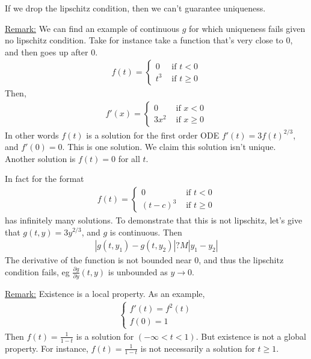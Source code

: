 \documentclass{article}
\newcommand*{\txt}[1]{\text{ #1 }}%
\begin{document}
If we drop the lipschitz condition, then we can't guarantee uniqueness.

\underline{Remark:} We can find an example of continuous $g$ for which uniqueness fails given no lipschitz condition. Take for instance take a function that's very close to 0, and then goes up after 0. \begin{align*}
    f(t)=\begin{cases}
        0 & \txt{if}t<0\\
        t^3 & \txt{if}t\geq 0
    \end{cases}
\end{align*}
Then, \begin{align*}
    f'(x)=\begin{cases}
        0 & \txt{if}x<0\\
        3x^2 & \txt{if}x\geq 0
    \end{cases}
\end{align*}
In other words $f(t)$ is a solution for the first order ODE $f'(t)=3f(t)^{2/3}$, and $f'(0)=0$. This is one solution. We claim this solution isn't unique. Another solution is $f(t)=0$ for all $t$.

In fact for the format \begin{align*}
    f(t)=\begin{cases}
        0 & \txt{if}t<0\\
        (t-c)^3 & \txt{if}t\geq 0
    \end{cases}
\end{align*} has infinitely many solutions. To demonstrate that this is not lipschitz, let's give that $g(t,y)=3y^{2/3}$, and $g$ is continuous. Then \begin{align*}
    |g(t,y_1)-g(t,y_2)|?M|y_1-y_2|
\end{align*} The derivative of the function is not bounded near 0, and thus the lipschitz condition fails, eg $\frac{\partial g}{\partial y}(t,y)$ is unbounded as $y\to 0$.

\underline{Remark:} Existence is a local property. As an example, \begin{align*}
    \begin{cases}
        f'(t)=f^2(t) \\
        f(0)=1
    \end{cases}
\end{align*} Then $f(t)=\frac{1}{1-t}$ is a solution for $(-\infty<t<1)$. But existence is not a global property. For instance, $f(t)=\frac{1}{1-t}$ is not necessarily a solution for $t\geq 1$.
\end{document}
